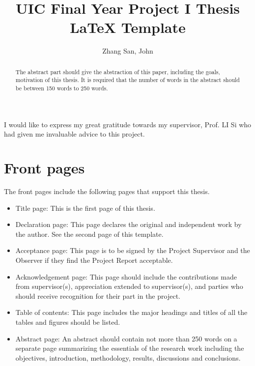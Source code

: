 \documentclass[12pt]{article}
\title{UIC Final Year Project I Thesis \LaTeX{} Template}
\author{Zhang San, John}
\begin{document}

\maketitle
\thispagestyle{empty}
\newpage
\clearpage{}
\setcounter{page}{2}

\newpage

\begin{acknowledgement}
    I would like to express my great gratitude towards my supervisor, Prof. LI Si who had given me invaluable advice to this project.
\end{acknowledgement}

\clearpage{}
\newpage
\clearpage{}
\setcounter{page}{1} %
\maketitle
\thispagestyle{empty}
\newpage
{}
\begin{abstract}
    The abstract part should give the abstraction of this paper, including the goals, motivation of this thesis. It is required that the number of words in the abstract should be between 150 words to 250 words.
\end{abstract}
\newpage
\tableofcontents{}
\newpage
\section{Front pages}
The front pages include the following pages that support this thesis. 
\begin{itemize}
    \item Title page: This is the first page of this thesis.
    \item Declaration page: This page declares the original and independent work by the author. See the second page of this template.
    \item Acceptance page: This page is to be signed by the Project Supervisor and the Observer if they find the Project Report acceptable. 
    \item Acknowledgement page: This page should include the contributions made from supervisor(s), appreciation extended to supervisor(s), and parties who should receive recognition for their part in the project. 
    \item Table of contents: This page includes the major headings and titles of all the tables and figures should be listed. 
    \item Abstract page: An abstract should contain not more than 250 words on a separate page summarizing the essentials of the research work including the objectives, introduction, methodology, results, discussions and conclusions. 
\end{itemize}
\end{document}
